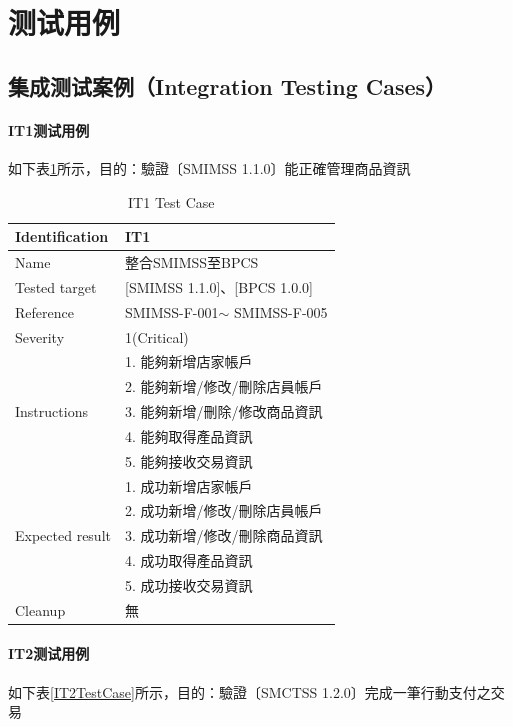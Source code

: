 		\section{测试用例}
			\subsection{集成测试案例（Integration Testing Cases）}
				
			\paragraph{IT1测试用例}
				如下表\ref{IT1TestCase}所示，目的：驗證〔SMIMSS 1.1.0〕能正確管理商品資訊

				\begin{table}[htbp]
				\centering
				\caption{IT1 Test Case}
				\label{IT1TestCase}
				\begin{tabular}{|l|l|}
				\hline
				Identification & IT1 \\ \hline
				Name & 整合SMIMSS至BPCS \\ \hline
				Tested target & {[}SMIMSS 1.1.0{]}、{[}BPCS 1.0.0{]} \\ \hline
				Reference & SMIMSS-F-001$\sim$ SMIMSS-F-005 \\ \hline
				Severity & 1(Critical) \\ \hline
				\multirow{5}{*}{Instructions} & 1.     能夠新增店家帳戶 \\ \cline{2-2} 
				 & 2.     能夠新增/修改/刪除店員帳戶 \\ \cline{2-2} 
				 & 3.     能夠新增/刪除/修改商品資訊 \\ \cline{2-2} 
				 & 4.     能夠取得產品資訊 \\ \cline{2-2} 
				 & 5.     能夠接收交易資訊 \\ \hline
				\multirow{5}{*}{Expected result} & 1.     成功新增店家帳戶 \\ \cline{2-2} 
				 & 2.     成功新增/修改/刪除店員帳戶 \\ \cline{2-2} 
				 & 3.     成功新增/修改/刪除商品資訊 \\ \cline{2-2} 
				 & 4.     成功取得產品資訊 \\ \cline{2-2} 
				 & 5.     成功接收交易資訊 \\ \hline
				Cleanup & 無 \\ \hline
				\end{tabular}
				\end{table}


			\paragraph{IT2测试用例}
				如下表\ref{IT2TestCase}所示，目的：驗證〔SMCTSS 1.2.0〕完成一筆行動支付之交易


